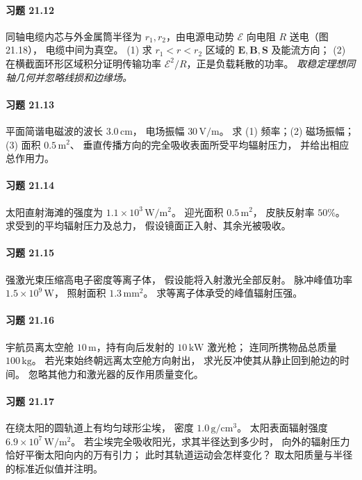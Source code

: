 \paragraph{习题 21.12}
同轴电缆内芯与外金属筒半径为
\(r_1,r_2\)，由电源电动势 \(\mathcal E\)
向电阻 \(R\) 送电（图21.18），
电缆中间为真空。
(1) 求 \(r_1<r<r_2\) 区域的
\(\boldsymbol E,\boldsymbol B,\boldsymbol S\)
及能流方向；
(2) 在横截面环形区域积分证明传输功率
\(\mathcal E^2/R\)，正是负载耗散的功率。
\textit{取稳定理想同轴几何并忽略线损和边缘场。}

\paragraph{习题 21.13}
平面简谐电磁波的波长 \(3.0\,\mathrm{cm}\)，
电场振幅 \(30\,\mathrm{V/m}\)。
求 (1) 频率；(2) 磁场振幅；
(3) 面积 \(0.5\,\mathrm{m^2}\)、
垂直传播方向的完全吸收表面所受平均辐射压力，
并给出相应总作用力。

\paragraph{习题 21.14}
太阳直射海滩的强度为
\(1.1\times10^3\,\mathrm{W/m^2}\)。
迎光面积 \(0.5\,\mathrm{m^2}\)，
皮肤反射率 \(50\%\)。
求受到的平均辐射压力及总力，
假设镜面正入射、其余光被吸收。

\paragraph{习题 21.15}
强激光束压缩高电子密度等离子体，
假设能将入射激光全部反射。
脉冲峰值功率 \(1.5\times10^9\,\mathrm W\)，
照射面积 \(1.3\,\mathrm{mm^2}\)。
求等离子体承受的峰值辐射压强。

\paragraph{习题 21.16}
宇航员离太空舱 \(10\,\mathrm m\)，持有向后发射的
\(10\,\mathrm{kW}\) 激光枪；
连同所携物品总质量 \(100\,\mathrm{kg}\)。
若光束始终朝远离太空舱方向射出，
求光反冲使其从静止回到舱边的时间。
忽略其他力和激光器的反作用质量变化。

\paragraph{习题 21.17}
在绕太阳的圆轨道上有均匀球形尘埃，
密度 \(1.0\,\mathrm{g/cm^3}\)。
太阳表面辐射强度
\(6.9\times10^7\,\mathrm{W/m^2}\)。
若尘埃完全吸收阳光，求其半径达到多少时，
向外的辐射压力恰好平衡太阳向内的万有引力；
此时其轨道运动会怎样变化？
取太阳质量与半径的标准近似值并注明。
